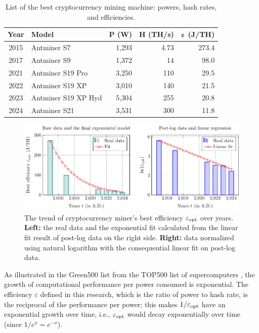\documentclass[12pt]{article}
\begin{document}
\begin{table}[!t]
	\centering
	\caption{List of the best cryptocurrency mining machine: powers, hash rates, and efficiencies.}
	\label{table_best_miners}
	\small
	\begin{tabular}{c|lrr|r}
		\hline
		\textbf{Year} & \textbf{Model} & $\boldsymbol{P}$ (W) & $\boldsymbol{H}$ (TH/s) & $\boldsymbol{\varepsilon}$ (J/TH)\\
		\hline
		2015 & Antminer S7 & 1,293 & 4.73 & 273.4 \\
		2017 & Antminer S9 & 1,372 & 14 & 98.0 \\
		2021 & Antminer S19 Pro & 3,250 & 110 & 29.5 \\
		2022 & Antminer S19 XP & 3,010 & 140 & 21.5 \\
		2023 & Antminer S19 XP Hyd & 5,304 & 255 & 20.8 \\
		2024 & Antminer S21 & 3,531 & 300 & 11.8 \\
		\hline
	\end{tabular}
\end{table}

\begin{figure}[!t]
	\centering
	\includegraphics{figures/trends/miner.pdf}
	\caption{The trend of cryptocurrency miner's best efficiency $\varepsilon_{\rm opt}$ over years. \textbf{Left:} the real data and the exponential fit calculated from the linear fit result of post-log data on the right side. \textbf{Right:} data normalized using natural logarithm with the consequential linear fit on post-log data.}
	\label{fig_miner_trend}
\end{figure}

As illustrated in the Green500 list from the TOP500 list of supercomputers \citep{top500}, the growth of computational performance per power consumed is exponential. The efficiency $\varepsilon$ defined in this research, which is the ratio of power to hash rate, is the reciprocal of the performance per power; this makes $1/\varepsilon_{\rm opt}$ have an exponential growth over time, i.e., $\varepsilon_{\rm opt}$ would decay exponentially over time (since $1/e^x = e^{-x}$).
\end{document}
